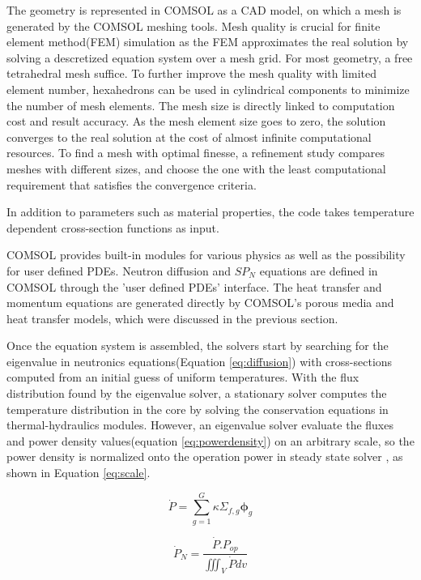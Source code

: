 \documentclass{elsarticle}
\newcommand{\flux}{{\ensuremath{\boldsymbol{\phi}}} }
\begin{document}
The geometry is represented in COMSOL as a CAD model, on which a mesh is generated by the COMSOL meshing tools.
Mesh quality is crucial for finite element method(FEM) simulation as the FEM approximates the real solution by solving a descretized equation system over a mesh grid. For most geometry, a free tetrahedral mesh suffice. To further improve the mesh quality with limited element number, hexahedrons can be used in cylindrical components to minimize the number of mesh elements. The mesh size is directly linked to computation cost and result accuracy. As the mesh element size goes to zero, the solution converges to the real solution at the cost of almost infinite computational resources. 
To find a mesh with optimal finesse, a refinement study compares meshes with different sizes, and choose the one with the least computational requirement that satisfies the convergence criteria. 

In addition to parameters such as material properties, the code takes temperature dependent cross-section functions as input.

COMSOL provides built-in modules for various physics as well as the possibility for user defined PDEs. Neutron diffusion and $SP_N$ equations are defined in COMSOL through the 'user defined PDEs' interface. The heat transfer and momentum equations are generated directly by COMSOL's porous media and heat transfer models, which were discussed in the previous section.



Once the equation system is assembled, the solvers start by searching for the eigenvalue in neutronics equations(Equation \ref{eq:diffusion}) with cross-sections computed from an initial guess of uniform temperatures. 
With the flux distribution found by the eigenvalue solver, a stationary solver computes the temperature distribution in the core by solving the conservation equations in thermal-hydraulics modules. However, an eigenvalue solver evaluate the fluxes and power density values(equation \ref{eq:powerdensity}) on an arbitrary scale, so the power density is normalized onto the operation power in steady state solver , as shown in Equation \ref{eq:scale}.  

\begin{equation}
  \dot{P} = \sum_{g=1}^G \kappa \Sigma_{f,g} \flux _g
  \label{eq:powerdensity}
\end{equation}

\begin{equation}
  \dot{P}_N = \frac{\dot{P}.P_{op}}{\iiint_V{\dot{P}dv}}
  \label{eq:scale}
\end{equation}
\end{document}
